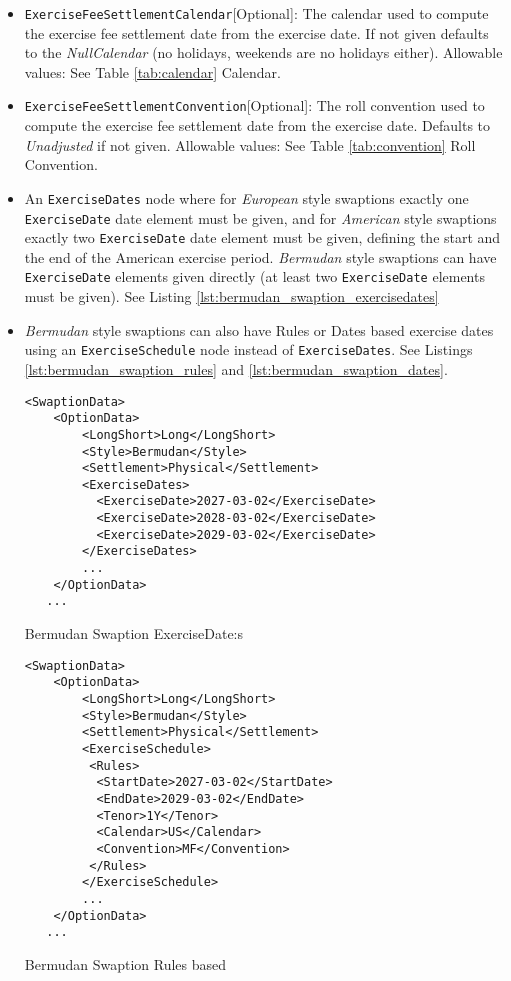 \begin{itemize}
\item \lstinline!ExerciseFeeSettlementCalendar![Optional]: The calendar used to compute the exercise fee settlement date from the
  exercise date. If not given defaults to the \emph{NullCalendar} (no holidays, weekends are no holidays either). Allowable values: See Table \ref{tab:calendar} Calendar.

\item \lstinline!ExerciseFeeSettlementConvention![Optional]: The roll convention used to compute the exercise fee settlement date from
  the exercise date. Defaults to \emph{Unadjusted} if not given. Allowable values: See Table \ref{tab:convention} Roll Convention.

\item An \lstinline!ExerciseDates! node where for \emph{European} style swaptions exactly one \lstinline!ExerciseDate! date element must be given, and for \emph{American} style swaptions  exactly two \lstinline!ExerciseDate! date element must be given, defining the start and the end of the American exercise period.  \emph{Bermudan} style swaptions can have \lstinline!ExerciseDate! elements given directly (at least two  \lstinline!ExerciseDate! elements must be given). See Listing \ref{lst:bermudan_swaption_exercisedates}

\item  \emph{Bermudan} style swaptions can also have Rules or Dates based exercise dates using an  \lstinline!ExerciseSchedule! node instead of  \lstinline!ExerciseDates!. See Listings \ref{lst:bermudan_swaption_rules} and \ref{lst:bermudan_swaption_dates}.


\begin{listing}[H]
\begin{verbatim}
<SwaptionData>
    <OptionData>
        <LongShort>Long</LongShort>
        <Style>Bermudan</Style>
        <Settlement>Physical</Settlement>
        <ExerciseDates>
          <ExerciseDate>2027-03-02</ExerciseDate>
          <ExerciseDate>2028-03-02</ExerciseDate>
          <ExerciseDate>2029-03-02</ExerciseDate>
        </ExerciseDates>
        ...
    </OptionData>
   ...
\end{verbatim}
\caption{Bermudan Swaption ExerciseDate:s}
\label{lst:bermudan_swaption_exercisedates}
\end{listing}

\begin{listing}[H]
\begin{verbatim}
<SwaptionData>
    <OptionData>
        <LongShort>Long</LongShort>
        <Style>Bermudan</Style>
        <Settlement>Physical</Settlement>
        <ExerciseSchedule>
         <Rules>
          <StartDate>2027-03-02</StartDate>
          <EndDate>2029-03-02</EndDate>
          <Tenor>1Y</Tenor>
          <Calendar>US</Calendar>
          <Convention>MF</Convention>
         </Rules>                    
        </ExerciseSchedule>
        ...
    </OptionData>
   ...
\end{verbatim}
\caption{Bermudan Swaption Rules based}
\label{lst:bermudan_swaption_rules}
\end{listing}


\end{itemize}
